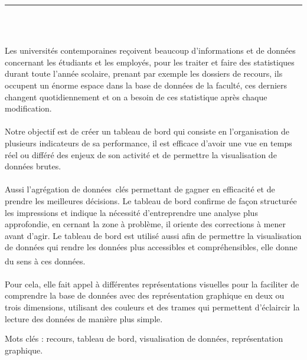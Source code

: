 \documentclass[12pt]{report}
\newenvironment{changemargin}[2]{%
\begin{list}{}{%
\setlength{\topsep}{0pt}%
\setlength{\leftmargin}{#1}%
\setlength{\rightmargin}{#2}%
\setlength{\listparindent}{\parindent}%
\setlength{\itemindent}{\parindent}%
\setlength{\parsep}{\parskip}%
}%
\item[]}{\end{list}}
\begin{document}
\begin{center}
    {\color{Blue} \rule{3in}{1.4mm} }\\
    \vspace{0.1in}
    \scshape{\fontsize{34}{46}{\bfseries{\color{Blue}{Résumé}}}}
    \\
    \vspace{0.6in}
\end{center}
\begin{changemargin}{0.9cm}{0.9cm}
Les universités contemporaines reçoivent beaucoup d’informations et de données concernant les étudiants et les employés, pour les traiter et faire des statistiques durant toute l’année scolaire, prenant par exemple les dossiers de recours, ils occupent un énorme espace dans la base de données de la faculté, ces derniers changent quotidiennement et on a besoin de ces statistique après chaque modification.
\\\\
Notre objectif est de créer un tableau de bord qui consiste en l'organisation de plusieurs indicateurs de sa performance, il est efficace d’avoir une vue en temps réel ou différé des enjeux de son activité et de permettre la visualisation de données brutes.
\\\\
Aussi l’agrégation de données clés permettant de gagner en efficacité et de prendre les meilleures décisions. Le tableau de bord confirme de façon structurée les impressions et  indique la nécessité d’entreprendre une analyse plus approfondie, en cernant la zone à problème, il oriente des corrections à mener avant d’agir. Le tableau de bord est utilisé aussi afin de permettre la visualisation de données qui rendre les données plus accessibles et compréhensibles, elle donne du sens à ces données.\textsuperscript{\cite{few2006information}}
\\\\
Pour cela, elle fait appel à différentes représentations visuelles pour la faciliter de comprendre la base de données avec des représentation graphique en deux ou trois dimensions, utilisant des couleurs et des trames qui permettent d'éclaircir la lecture des données de manière plus simple.
\end{changemargin}

\vspace{1in}

\begin{changemargin}{0.9cm}{0.9cm}
Mots clés : recours, tableau de bord, visualisation de données, représentation graphique.
\end{changemargin}
\end{document}
